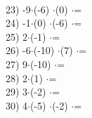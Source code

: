 \documentclass[a4paper,10pt]{article}
\begin{document}
\vspace{0.5cm}\\23)   -9$\cdot$(-6) $\cdot$(0) $\cdot$=
\vspace{0.5cm}\\24)   -1$\cdot$(0) $\cdot$(-6) $\cdot$=
\vspace{0.5cm}\\25)   2$\cdot$(-1) $\cdot$=
\vspace{0.5cm}\\26)   -6$\cdot$(-10) $\cdot$(7) $\cdot$=
\vspace{0.5cm}\\27)   9$\cdot$(-10) $\cdot$=
\vspace{0.5cm}\\28)   2$\cdot$(1) $\cdot$=
\vspace{0.5cm}\\29)   3$\cdot$(-2) $\cdot$=
\vspace{0.5cm}\\30)   4$\cdot$(-5) $\cdot$(-2) $\cdot$=
\vspace{0.5cm}\\\pagebreak
\end{document}
